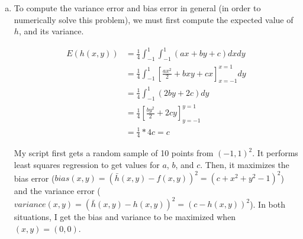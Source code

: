 \documentclass[fleqn]{homework}
\begin{document}
\begin{problem}{3}
\begin{enumerate}[(a)]
    \item To compute the variance error and bias error in general (in order to
      numerically solve this problem), we must first compute the expected value
      of $h$, and its variance.

      \begin{align*}
        E(h(x,y)) &= \frac{1}{4}\int_{-1}^1\int_{-1}^1 (ax + by + c) dx dy \\
        &= \frac{1}{4} \int_{-1}^1 \left[\frac{ax^2}{2} + bxy +
          cx\right]_{x=-1}^{x=1} dy \\
        &= \frac{1}{4} \int_{-1}^1 (2by + 2c)dy \\
        &= \frac{1}{4} \left[\frac{by^2}{2} + 2cy\right]_{y=-1}^{y=1} \\
        &= \frac{1}{4} * 4c = c
      \end{align*}

      My script first gets a random sample of 10 points from $(-1, 1)^2$.  It
      performs least squares regression to get values for $a$, $b$, and $c$.
      Then, it maximizes the bias error
      ($bias(x,y) = (\bar{h}(x,y) - f(x,y))^2 = (c + x^2 + y^2 - 1)^2$) and the
      variance error
      ($variance(x,y) = (\bar{h}(x,y) - h(x,y))^2 = (c - h(x,y))^2$).  In both
      situations, I get the bias and variance to be maximized when
      $(x,y) = (0,0)$.
    \end{enumerate}
  \end{problem}
\end{document}
